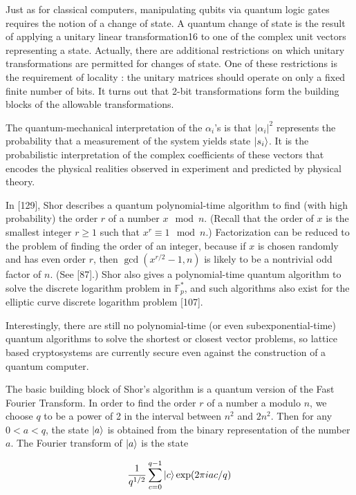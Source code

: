\documentclass{article}
\begin{document}
Just as for classical computers, manipulating qubits via quantum logic gates requires the notion of a change of state. A quantum change of state is the result of applying a unitary linear transformation16 to one of the complex unit vectors representing a state. Actually, there are additional restrictions on which unitary transformations are permitted for changes of state. One of these restrictions is the requirement of locality : the unitary matrices should operate on only a fixed finite number of bits. It turns out that 2-bit transformations form the building blocks of the allowable transformations.

The quantum-mechanical interpretation of the \(\alpha_i\)'s is that \(|\alpha_i|^2\) represents the probability that a measurement of the system yields state \(\ket{s_i}\). It is the probabilistic interpretation of the complex coefficients of these vectors that encodes the physical realities observed in experiment and predicted by physical theory.

In [129], Shor describes a quantum polynomial-time algorithm to find (with high probability) the order \(r\) of a number \(x \mod n\). (Recall that the order of \(x\) is the smallest integer \(r \geq 1\) such that \(x^r \equiv 1 \mod n\).) Factorization can be reduced to the problem of finding the order of an integer, because if \(x\) is chosen randomly and has even order \(r\), then \(\gcd(x^{r/2} - 1, n)\) is likely to be a nontrivial odd factor of \(n\). (See [87].) Shor also gives a polynomial-time quantum algorithm to solve the discrete logarithm problem in \(\mathbb{F}_p^*\), and such algorithms also exist for the elliptic curve discrete logarithm problem [107]. 

Interestingly, there are still no polynomial-time (or even subexponential-time) quantum algorithms to solve the shortest or closest vector problems, so lattice based cryptosystems are currently secure even against the construction of a quantum computer.
 
The basic building block of Shor's algorithm is a quantum version of the Fast Fourier Transform. In order to find the order \(r\) of a number a modulo \(n\), we choose \(q\) to be a power of 2 in the interval between \(n^{2}\) and \(2n^{2}\). Then for any \(0 < a < q\), the state \(\ket{a}\) is obtained from the binary representation of the number \(a\). The Fourier transform of \(\ket{a}\) is the state

\[
	\frac{1}{q^{1/2}} \sum_{c = 0}^{q - 1} \ket{c} \exp(2\pi i a c /q)
\]
\end{document}
